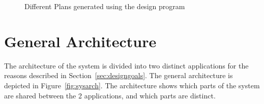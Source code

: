 \begin{figure}
  \centering
  \caption{Different Plans generated using the design program}
  \label{fig:designapp}
\end{figure}

\section{General Architecture}
The architecture of the system is divided into two distinct applications for the reasons described in Section~\ref{sec:designgoals}.
The general architecture is depicted in Figure~\ref{fig:sysarch}.
The architecture shows which parts of the system are shared between the 2 applications, and which parts are distinct.

